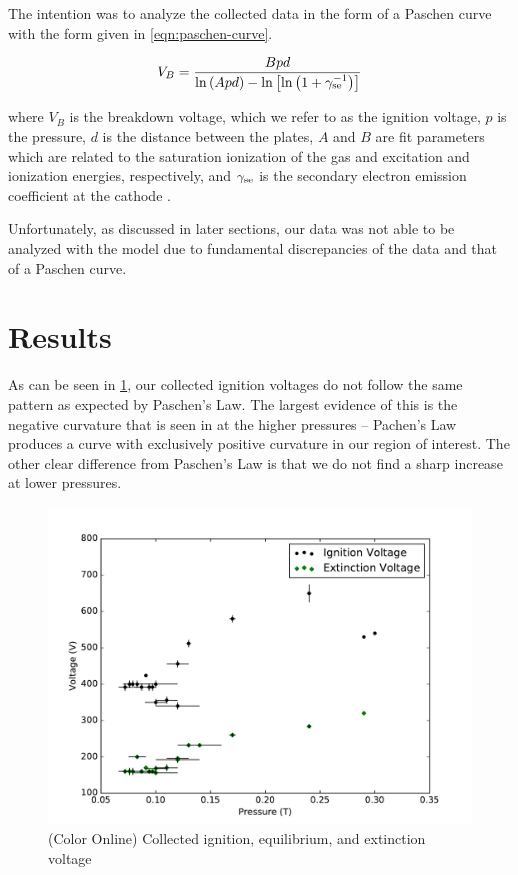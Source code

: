 \documentclass[reprint]{revtex4-1}
\begin{document}
The intention was to analyze the collected data in the form of a Paschen curve with the form given in \cref{eqn:paschen-curve}.

\begin{equation}
V_B = \frac{B p d}{\ln{\left( A p d \right)} - \ln{\left[ \ln{\left( 1 + \gamma_{\rm{se}}^{-1} \right)} \right]}}
\label{eqn:paschen-curve}
\end{equation}

where $V_B$ is the breakdown voltage, which we refer to as the ignition voltage, $p$ is the pressure, $d$ is the distance between the plates, $A$ and $B$ are fit parameters which are related to the saturation ionization of the gas and excitation and ionization energies, respectively, and $\gamma_{\rm{se}}$ is the secondary electron emission coefficient at the cathode \cite{Lieberman2005}.

Unfortunately, as discussed in later sections, our data was not able to be analyzed with the model due to fundamental discrepancies of the data and that of a Paschen curve.

\section{Results}

As can be seen in \cref{fig:ignition-extinction}, our collected ignition voltages do not follow the same pattern as expected by Paschen's Law. The largest evidence of this is the negative curvature that is seen in at the higher pressures -- Pachen's Law produces a curve with exclusively positive curvature in our region of interest. The other clear difference from Paschen's Law is that we do not find a sharp increase at lower pressures.

\begin{figure}[h]
\includegraphics[width=\columnwidth]{../resources/ignition-extinction.pdf}
\caption{(Color Online) Collected ignition, equilibrium, and extinction voltage}
\label{fig:ignition-extinction}
\end{figure}
\end{document}
